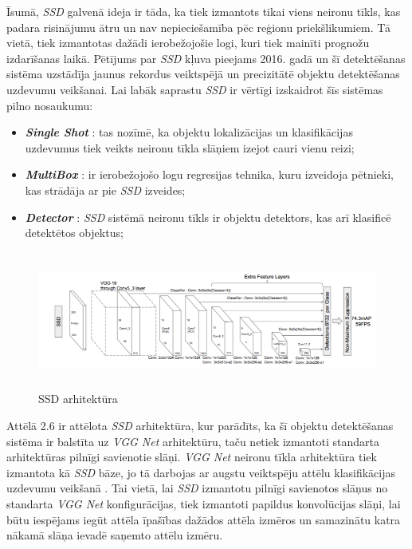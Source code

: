 Īsumā, \textit{SSD} galvenā ideja ir tāda, ka tiek izmantots tikai viens neironu tīkls, kas padara risinājumu ātru un nav nepieciešamība pēc reģionu priekšlikumiem. Tā vietā, tiek izmantotas dažādi ierobežojošie logi, kuri tiek mainīti prognožu izdarīšanas laikā. Pētījums par \textit{SSD} kļuva pieejams 2016. gadā \cite{liu2016ssd} un šī detektēšanas sistēma uzstādīja jaunus rekordus veiktspējā un precizitātē objektu detektēšanas uzdevumu veikšanai. Lai labāk saprastu \textit{SSD} ir vērtīgi izskaidrot šīs sistēmas pilno nosaukumu:
\begin{itemize}
	\item \textit{\textbf{Single Shot}} : tas nozīmē, ka objektu lokalizācijas un klasifikācijas uzdevumus tiek veikts neironu tīkla slāņiem izejot cauri vienu reizi;
	\item \textit{\textbf{MultiBox}} : ir ierobežojošo logu regresijas tehnika, kuru izveidoja pētnieki, kas strādāja ar pie \textit{SSD} izveides;
	\item  \textit{\textbf{Detector}} : \textit{SSD} sistēmā neironu tīkls ir objektu detektors, kas arī klasificē detektētos objektus;
\end{itemize}

\begin{figure}[h]%
	\centering
	\includegraphics[height=4.5cm]{images/ssdarch.png} %
	\caption{SSD arhitektūra \cite{ssdarch}}%
	\label{fig:example}%
\end{figure}

Attēlā 2.6 ir attēlota \textit{SSD} arhitektūra, kur parādīts, ka šī objektu detektēšanas sistēma ir balstīta uz \textit{VGG Net} arhitektūru, taču netiek izmantoti standarta arhitektūras pilnīgi savienotie slāņi. \textit{VGG Net} neironu tīkla arhitektūra tiek izmantota kā \textit{SSD} bāze, jo tā darbojas ar augstu veiktspēju attēlu klasifikācijas uzdevumu veikšanā \cite{simonyan2014very}. Tai vietā, lai \textit{SSD} izmantotu pilnīgi savienotos slāņus no standarta \textit{VGG Net} konfigurācijas, tiek izmantoti papildus konvolūcijas slāņi, lai būtu iespējams iegūt attēla īpašības dažādos attēla izmēros un samazinātu katra nākamā slāņa ievadē saņemto attēlu izmēru. 

